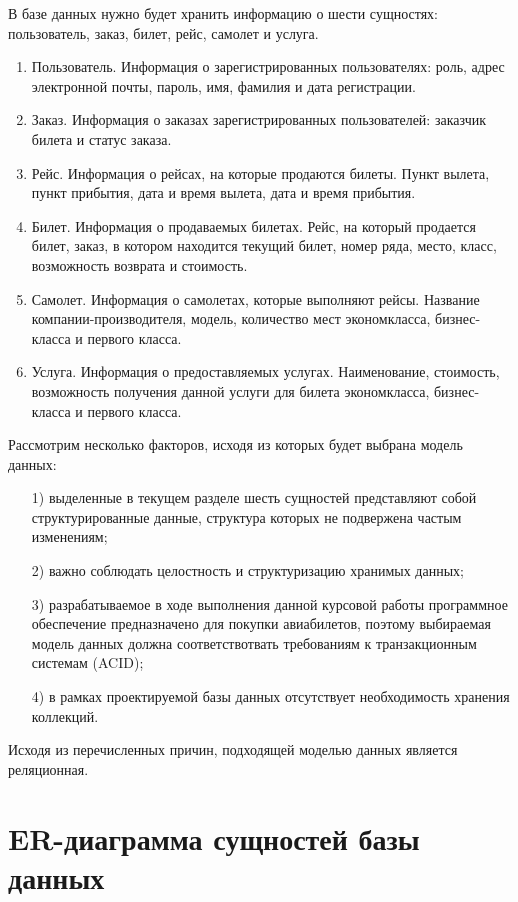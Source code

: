 \documentclass{bmstu}
\begin{document}
В базе данных нужно будет хранить информацию о шести сущностях: пользователь, заказ, билет, рейс, самолет и услуга.
\begin{enumerate}
\item Пользователь. 
Информация о зарегистрированных пользователях: роль, адрес электронной почты, пароль, имя, фамилия и дата регистрации.
\item Заказ. 
Информация о заказах зарегистрированных пользователей: заказчик билета и статус заказа.
\item Рейс. 
Информация о рейсах, на которые продаются билеты. 
Пункт вылета, пункт прибытия, дата и время вылета, дата и время прибытия.
\item Билет.
Информация о продаваемых билетах. 
Рейс, на который продается билет, заказ, в котором находится текущий билет, номер ряда, место, класс, возможность возврата и стоимость. 
\item Самолет. 
Информация о самолетах, которые выполняют рейсы. 
Название компании-производителя, модель, количество мест экономкласса, бизнес-класса и первого класса.
\item Услуга. 
Информация о предоставляемых услугах. 
Наименование, стоимость, возможность получения данной услуги для билета экономкласса, бизнес-класса и первого класса.
\end{enumerate}

Рассмотрим несколько факторов, исходя из которых будет выбрана модель данных:

\begin{enumerate}
\item[1)] выделенные в текущем разделе шесть сущностей представляют собой структурированные данные, структура которых не подвержена частым изменениям;
\item[2)] важно соблюдать целостность и структуризацию хранимых данных;
\item[3)] разрабатываемое в ходе выполнения данной курсовой работы программное обеспечение предназначено для покупки авиабилетов, поэтому выбираемая модель данных должна соответствотвать требованиям к транзакционным системам (ACID);
\item[4)] в рамках проектируемой базы данных отсутствует необходимость хранения коллекций.
\end{enumerate}
 
Исходя из перечисленных причин, подходящей моделью данных является реляционная.

\pagebreak
\section{ER-диаграмма сущностей базы данных}
\end{document}
